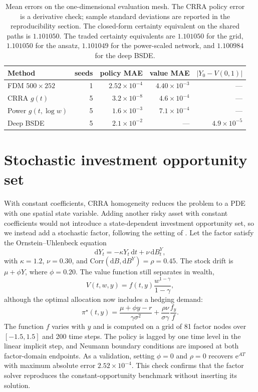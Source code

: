 \documentclass[11pt,a4paper]{article}
\begin{document}
\begin{table}[H]
\centering
\caption{Mean errors on the one-dimensional evaluation mesh. The CRRA policy error is a derivative check; sample standard deviations are reported in the reproducibility section. The closed-form certainty equivalent on the shared paths is $1.101050$. The traded certainty equivalents are $1.101050$ for the grid, $1.101050$ for the ansatz, $1.101049$ for the power-scaled network, and $1.100984$ for the deep BSDE.}
\label{tab:main1d}
{\small
\begin{tabular}{lrrrr}
\toprule
Method & seeds & policy MAE & value MAE & $|Y_0-V(0,1)|$ \\
\midrule
FDM $500\times 252$ & 1 & $2.52\times 10^{-4}$ & $4.40\times 10^{-3}$ & --- \\
CRRA $g(t)$ & 5 & $3.2\times 10^{-8}$ & $4.6\times 10^{-4}$ & --- \\
Power $g(t,\log w)$ & 5 & $1.6\times 10^{-3}$ & $7.1\times 10^{-4}$ & --- \\
Deep BSDE & 5 & $2.1\times 10^{-2}$ & --- & $4.9\times 10^{-5}$ \\
\bottomrule
\end{tabular}
}
\end{table}

\section{Stochastic investment opportunity set}
\label{sec:factor}

With constant coefficients, CRRA homogeneity reduces the problem to a PDE with one spatial state variable. Adding another risky asset with constant coefficients would not introduce a state-dependent investment opportunity set, so we instead add a stochastic factor, following the setting of \citet{kim1996}. Let the factor satisfy the Ornstein--Uhlenbeck equation
\begin{equation}
\mathrm dY_t = -\kappa Y_t\,\mathrm dt + \nu\,\mathrm dB^Y_t,
\end{equation}
with $\kappa=1.2$, $\nu=0.30$, and $\mathrm{Corr}(\mathrm dB,\mathrm dB^Y)=\rho=0.45$. The stock drift is $\mu+\phi Y$, where $\phi=0.20$. The value function still separates in wealth,
\begin{equation}
V(t,w,y)=f(t,y)\frac{w^{1-\gamma}}{1-\gamma},
\end{equation}
although the optimal allocation now includes a hedging demand:
\begin{equation}
\pi^{\star}(t,y)=\frac{\mu+\phi y-r}{\gamma\sigma^2}+\frac{\rho\nu}{\sigma\gamma}\frac{f_y}{f}.
\end{equation}
The function $f$ varies with $y$ and is computed on a grid of 81 factor nodes over $[-1.5,1.5]$ and 200 time steps. The policy is lagged by one time level in the linear implicit step, and Neumann boundary conditions are imposed at both factor-domain endpoints. As a validation, setting $\phi=0$ and $\rho=0$ recovers $\mathrm e^{AT}$ with maximum absolute error $2.52\times 10^{-4}$. This check confirms that the factor solver reproduces the constant-opportunity benchmark without inserting its solution.
\end{document}
